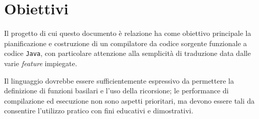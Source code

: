 \section{Obiettivi}
\label{sec:1-2-objectives}

Il progetto di cui questo documento è relazione ha come obiettivo principale la pianificazione e costruzione
di un compilatore da codice sorgente funzionale a codice \texttt{Java}, con particolare attenzione alla semplicità
di traduzione data dalle varie \textit{feature} impiegate.

\noindent Il linguaggio dovrebbe essere sufficientemente espressivo da permettere la definizione di funzioni basilari
e l'uso della ricorsione; le performance di compilazione ed esecuzione non sono aspetti prioritari,
ma devono essere tali da consentire l'utilizzo pratico con fini educativi e dimostrativi. 